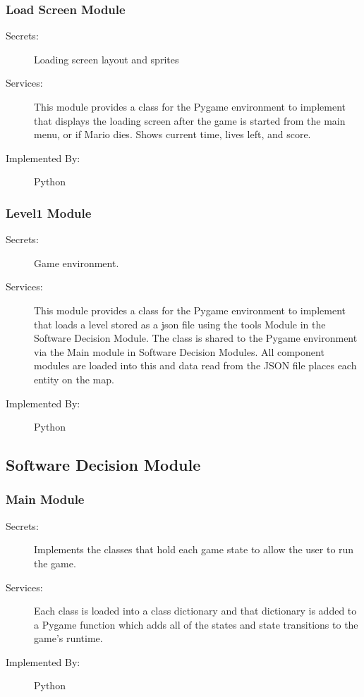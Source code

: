 \documentclass[12pt, titlepage]{article}
\begin{document}
\subsubsection{Load Screen Module}
\begin{description}
\item[Secrets:]Loading screen layout and sprites
\item[Services:] This module provides a class for the Pygame environment to implement that displays the loading
    screen after the game is started from the main menu, or if Mario dies. Shows current time, lives left, and
    score.
\item[Implemented By:] Python
\end{description}

\subsubsection{Level1 Module}
\begin{description}
\item[Secrets:]Game environment.
\item[Services:] This module provides a class for the Pygame environment to implement that loads a level stored as
    a json file using the tools Module in the Software Decision Module. The class is shared to the Pygame
    environment via the Main module in Software Decision Modules. All component modules are loaded into this and
    data read from the JSON file places each entity on the map.
\item[Implemented By:] Python
\end{description}

\subsection{Software Decision Module}

\subsubsection{Main Module}
\begin{description}
\item[Secrets:]Implements the classes that hold each game state to allow the user to run the game.
\item[Services:] Each class is loaded into a class dictionary and that dictionary is added to a Pygame function
    which adds all of the states and state transitions to the game's runtime.
\item[Implemented By:] Python
\end{description}
\end{document}
